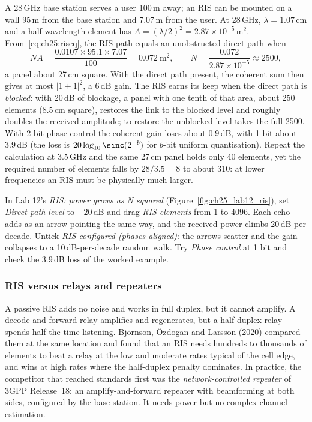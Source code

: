 \begin{worked}
A 28\,GHz base station serves a user 100\,m away; an RIS can be mounted on a wall 95\,m from the base
station and 7.07\,m from the user. At 28\,GHz, $\lambda=1.07$\,cm and a half-wavelength element has
$A=(\lambda/2)^2=2.87\times10^{-5}$\,m$^2$. From~\eqref{eq:ch25:riseq}, the RIS path equals an unobstructed
direct path when
\[
NA=\frac{0.0107\times95.1\times7.07}{100}=0.072\ \text{m}^2,\qquad N=\frac{0.072}{2.87\times10^{-5}}\approx2500,
\]
a panel about 27\,cm square. With the direct path present, the coherent sum then gives at most
$|1+1|^2$, a 6\,dB gain. The RIS earns its keep when the direct path is \emph{blocked}: with 20\,dB of
blockage, a panel with one tenth of that area, about 250 elements (8.5\,cm square), restores the
link to the blocked level and roughly doubles the received amplitude; to restore the unblocked level
takes the full 2500. With 2-bit phase control the coherent gain loses about 0.9\,dB, with 1-bit about
3.9\,dB (the loss is $20\log_{10}\sinc(2^{-b})$ for $b$-bit uniform quantisation). Repeat the
calculation at 3.5\,GHz and the same 27\,cm panel holds only 40 elements, yet the required number of
elements falls by $28/3.5=8$ to about 310: at lower frequencies an RIS must be physically much larger.
\end{worked}


\begin{tryit}
In Lab 12's \emph{RIS: power grows as N squared} (Figure~\ref{fig:ch25_lab12_ris}), set \emph{Direct
path level} to $-20$\,dB and drag \emph{RIS elements} from 1 to 4096. Each echo adds as an arrow
pointing the same way, and the received power climbs 20\,dB per decade. Untick \emph{RIS configured
(phases aligned)}: the arrows scatter and the gain collapses to a 10\,dB-per-decade random walk. Try
\emph{Phase control} at 1 bit and check the 3.9\,dB loss of the worked example.
\end{tryit}

\subsubsection{RIS versus relays and repeaters}
A passive RIS adds no noise and works in full duplex, but it cannot amplify. A decode-and-forward
relay amplifies and regenerates, but a half-duplex relay spends half the time listening. Bj\"ornson,
\"Ozdogan and Larsson (2020) compared them at the same location and found that an RIS needs hundreds
to thousands of elements to beat a relay at the low and moderate rates typical of the cell edge, and
wins at high rates where the half-duplex penalty dominates. In practice, the competitor that reached
standards first was the \emph{network-controlled repeater} of 3GPP Release~18: an amplify-and-forward
repeater with beamforming at both sides, configured by the base station. It needs power but no complex
channel estimation.

